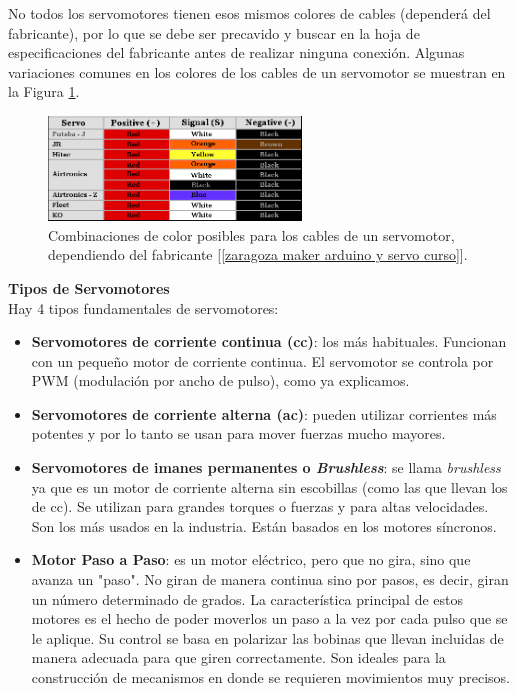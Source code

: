 \documentclass[12pt]{article}
\begin{document}
	\noindent No todos los servomotores tienen esos mismos colores de cables (dependerá del fabricante), por lo que se debe ser precavido y buscar en la hoja de especificaciones del fabricante antes de realizar ninguna conexión. Algunas variaciones comunes en los colores de los cables de un servomotor se muestran en la Figura \ref{servo wire color code}. \\
	
	\begin{figure}[h]
		\begin{center}
			\includegraphics[width=0.6\textwidth]{img/servo_wire_color_code.png}
			\caption{Combinaciones de color posibles para los cables de un servomotor, dependiendo del fabricante [\ref{zaragoza maker arduino y servo curso}].}
			\label{servo wire color code}
		\end{center}
	\end{figure}
	
	\noindent \textbf{Tipos de Servomotores}\\
	
	\noindent Hay 4 tipos fundamentales de servomotores:
	
	\begin{itemize}
		\item \textbf{Servomotores de corriente continua (cc)}: los más habituales. Funcionan con un pequeño motor de corriente continua. El servomotor se controla por PWM (modulación por ancho de pulso), como ya explicamos.
		\item \textbf{Servomotores de corriente alterna (ac)}: pueden utilizar corrientes más potentes y por lo tanto se usan para mover fuerzas mucho mayores.
		\item \textbf{Servomotores de imanes permanentes o \textit{Brushless}}: se llama \textit{brushless} ya que es un motor de corriente alterna sin escobillas (como las que llevan los de cc). Se utilizan para grandes torques o fuerzas y para altas velocidades. Son los más usados en la industria. Están basados en los motores síncronos.
		\item \textbf{Motor Paso a Paso}: es un motor eléctrico, pero que no gira, sino que avanza un "paso". No giran de manera continua sino por pasos, es decir, giran un número determinado de grados. La característica principal de estos motores es el hecho de poder moverlos un paso a la vez por cada pulso que se le aplique. Su control se basa en polarizar las bobinas que llevan incluidas de manera adecuada para que giren correctamente. Son ideales para la construcción de mecanismos en donde se requieren movimientos muy precisos.
	\end{itemize}
	
\end{document}
